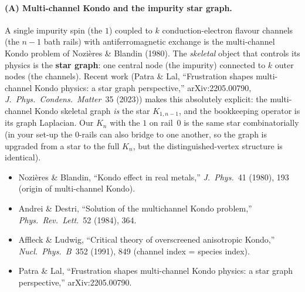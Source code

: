 \documentclass[11pt,a4paper]{article}
\begin{document}
\paragraph{(A) Multi-channel Kondo and the impurity star graph.}
A single impurity spin (the $1$) coupled to $k$ conduction-electron flavour
channels (the $n{-}1$ bath rails) with antiferromagnetic exchange is the
multi-channel Kondo problem of Nozi\`eres \& Blandin (1980). The
\emph{skeletal} object that controls its physics is the
\textbf{star graph}: one central node (the impurity) connected to $k$ outer
nodes (the channels). Recent work (Patra \& Lal,
``Frustration shapes multi-channel Kondo physics: a star graph
perspective,'' arXiv:2205.00790, \emph{J.\ Phys.\ Condens.\ Matter}~35
(2023)) makes this absolutely explicit: the multi-channel Kondo skeletal
graph \emph{is} the star $K_{1,n-1}$, and the bookkeeping operator is its
graph Laplacian. Our $K_n$ with the $1$ on rail~$0$ is the same star
combinatorially (in your set-up the $0$-rails can also bridge to one
another, so the graph is upgraded from a star to the full $K_n$, but the
distinguished-vertex structure is identical).
\begin{itemize}[leftmargin=2em,itemsep=1pt]
  \item Nozi\`eres \& Blandin, ``Kondo effect in real metals,''
        \emph{J.\ Phys.}~41 (1980), 193 (origin of multi-channel Kondo).
  \item Andrei \& Destri, ``Solution of the multichannel Kondo problem,''
        \emph{Phys.\ Rev.\ Lett.}~52 (1984), 364.
  \item Affleck \& Ludwig, ``Critical theory of overscreened anisotropic
        Kondo,'' \emph{Nucl.\ Phys.\ B}~352 (1991), 849 (channel index =
        species index).
  \item Patra \& Lal, ``Frustration shapes multi-channel Kondo physics: a
        star graph perspective,'' arXiv:2205.00790.
\end{itemize}
\end{document}
